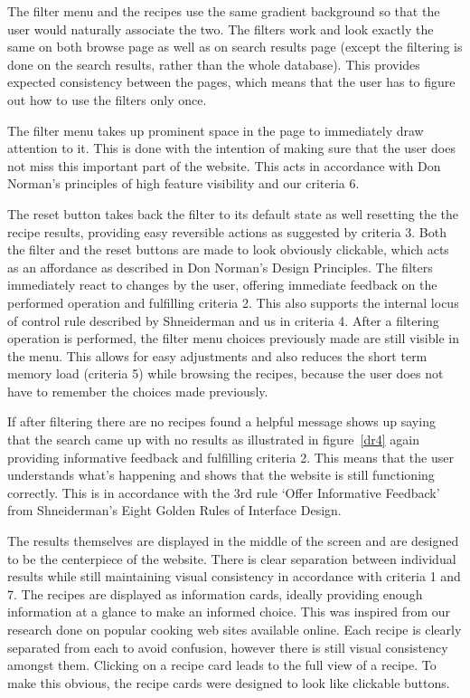 The filter menu and the recipes use the same gradient background so that the user would naturally associate the two. The filters work and look exactly the same on both browse page as well as on search results page (except the filtering is done on the search results, rather than the whole database). This provides expected consistency between the pages, which means that the user has to figure out how to use the filters only once.

The filter menu takes up prominent space in the page to immediately draw attention to it. This is done with the intention of making sure that the user does not miss this important part of the website. This acts in accordance with Don Norman’s principles of high feature visibility and our criteria 6.

The reset button takes back the filter to its default state as well resetting the the recipe results, providing easy reversible actions as suggested by criteria 3. Both the filter and the reset buttons are made to look obviously clickable, which acts as an affordance as described in Don Norman’s Design Principles. The filters immediately react to changes by the user, offering immediate feedback on the performed operation and fulfilling criteria 2. This also supports the internal locus of control rule described by Shneiderman and us in criteria 4. After a filtering operation is performed, the filter menu choices previously made are still visible in the menu. This allows for easy adjustments and also reduces the short term memory load (criteria 5) while browsing the recipes, because the user does not have to remember the choices made previously.

If after filtering there are no recipes found a helpful message shows up saying that the search came up with no results as illustrated in figure~\ref{dr4} again providing informative feedback and fulfilling criteria 2. This means that the user understands what’s happening and shows that the website is still functioning correctly. This is in accordance with the 3rd rule ‘Offer Informative Feedback’ from  Shneiderman’s Eight Golden Rules of Interface Design. 

The results themselves are displayed in the middle of the screen and are designed to be the centerpiece of the website. There is clear separation between individual results while still maintaining visual consistency in accordance with criteria 1 and 7. The recipes are displayed as information cards, ideally providing enough information at a glance to make an informed choice. This was inspired from our research done on popular cooking web sites available online. Each recipe is clearly separated from each to avoid confusion, however there is still visual consistency amongst them. Clicking on a recipe card leads to the full view of a recipe. To make this obvious, the recipe cards were designed to look like clickable buttons.